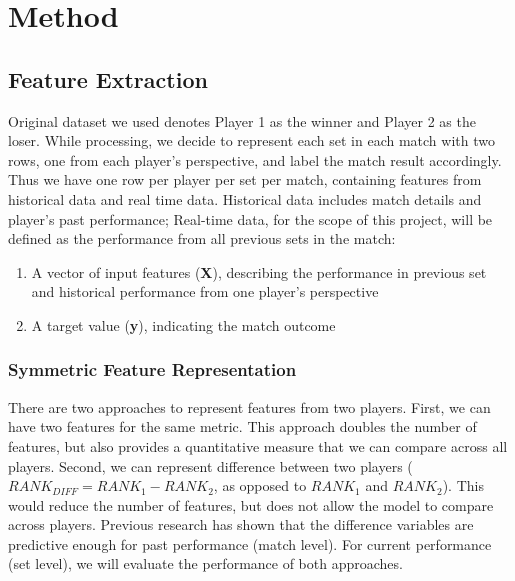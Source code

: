\documentclass[paper=a4, fontsize=11pt]{scrartcl} %
\numberwithin{equation}{section} %
\numberwithin{figure}{section} %
\numberwithin{table}{section} %
\begin{document}
\section{Method}
\subsection{Feature Extraction}
\label{sec:label}
Original dataset we used denotes Player 1 as the winner and Player 2 as the loser. While processing, we decide to represent each set in each match with two rows, one from each player's perspective, and label the match result accordingly. Thus we have one row per player per set per match, containing features from historical data and real time data. Historical data includes match details and player's past performance; Real-time data, for the scope of this project, will be defined as the performance from all previous sets in the match:
\begin{enumerate}
\item A vector of input features (\textbf{X}), describing the performance in previous set and historical performance from one player's perspective
\item A target value (\textbf{y}), indicating the match outcome
\end{enumerate}
\subsubsection{Symmetric Feature Representation}
There are two approaches to represent features from two players.  First, we can have two features for the same metric.  This approach doubles the number of features, but also provides a quantitative measure that we can compare across all players.  Second, we can represent difference between two players ($RANK_{DIFF} = RANK_1 - RANK_2$, as opposed to $RANK_1$ and $RANK_2$).  This would reduce the number of features, but does not allow the model to compare across players.  Previous research has shown that the difference variables are predictive enough \cite{tennis1} \cite{omalley} for past performance (match level).  For current performance (set level), we will evaluate the performance of both approaches.  
\end{document}
